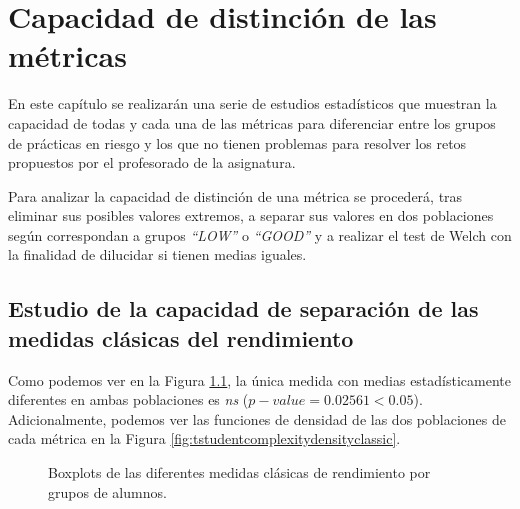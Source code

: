\chapter{Capacidad de distinción de las métricas}\label{sec:diferencias}

En este capítulo se realizarán una serie de estudios estadísticos que muestran la capacidad de todas y cada una de las métricas para diferenciar entre los grupos de prácticas en riesgo y los que no tienen problemas para resolver los retos propuestos por el profesorado de la asignatura.

Para analizar la capacidad de distinción de una métrica se procederá, tras eliminar sus posibles valores extremos, a separar sus valores en dos poblaciones según correspondan a grupos \emph{``LOW''} o \emph{``GOOD''} y a realizar el test de Welch con la finalidad de dilucidar si tienen medias iguales.

\section{Estudio de la capacidad de separación de las medidas clásicas del rendimiento}

Como podemos ver en la Figura \ref{fig:tstudentcomplexityclassic}, la única medida con medias estadísticamente diferentes en ambas poblaciones es \emph{ns} ($p-value = 0.02561 < 0.05$). %
Adicionalmente, podemos ver las funciones de densidad de las dos poblaciones de cada métrica en la Figura \ref{fig:tstudentcomplexitydensityclassic}.

\begin{figure}[H]
\centering
{}%
%

%

\caption{Boxplots de las diferentes medidas clásicas de rendimiento por grupos de alumnos.}
\label{fig:tstudentcomplexityclassic}
\end{figure}

